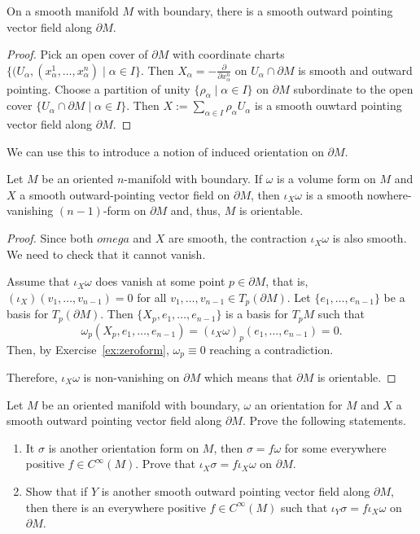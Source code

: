 \begin{proposition}
  On a smooth manifold $M$ with boundary, there is a smooth outward pointing vector field along $\partial M$.  
\end{proposition}
\begin{proof}
  Pick an open cover of $\partial M$ with coordinate charts $\{(U_\alpha, (x^1_\alpha,\ldots,x^n_\alpha) \mid \alpha\in I\}$. Then $X_\alpha = -\frac{\partial}{\partial x^n_\alpha}$ on $U_\alpha\cap \partial M$ is smooth and outward pointing.
  Choose a partition of unity $\{\rho_\alpha \mid \alpha\in I\}$ on $\partial M$ subordinate to the open cover $\{U_\alpha\cap \partial M \mid \alpha\in I\}$.
  Then $X:= \sum_{\alpha\in I}\rho_\alpha U_\alpha$ is a smooth ouwtard pointing vector field along $\partial M$.
\end{proof}

We can use this to introduce a notion of induced orientation on $\partial M$.

\begin{proposition}
  Let $M$ be an oriented $n$-manifold with boundary.
  If $\omega$ is a volume form on $M$ and $X$ a smooth outward-pointing vector field on $\partial M$, then $\iota_X\omega$ is a smooth nowhere-vanishing $(n-1)$-form on $\partial M$ and, thus, $M$ is orientable.
\end{proposition}
\begin{proof}
  Since both $omega$ and $X$ are smooth, the contraction $\iota_X\omega$ is also smooth.
  We need to check that it cannot vanish.

  Assume that $\iota_X\omega$ does vanish at some point $p\in\partial M$, that is, $(\iota_X)(v_1, \ldots, v_{n-1}) = 0$ for all $v_1, \ldots, v_{n-1}\in T_p(\partial M)$.
  Let $\{e_1,\ldots,e_{n-1}\}$ be a basis for $T_p(\partial M)$.
  Then $\{X_p,e_1,\ldots,e_{n-1}\}$ is a basis for $T_p M$ such that
  \begin{equation}
    \omega_p(X_p, e_1, \ldots, e_{n-1}) = (\iota_X\omega)_p(e_1, \ldots, e_{n-1}) = 0.
  \end{equation}
  Then, by Exercise~\ref{ex:zeroform}, $\omega_p\equiv0$ reaching a contradiction.
  
  Therefore, $\iota_X\omega$ is non-vanishing on $\partial M$ which means that $\partial M$ is orientable.
\end{proof}

\begin{exercise}
  Let $M$ be an oriented manifold with boundary, $\omega$ an orientation for $M$ and $X$ a smooth outward pointing vector field along $\partial M$.
  Prove the following statements.
  \begin{enumerate}
    \item It $\sigma$ is another orientation form on $M$, then $\sigma = f\omega$ for some everywhere positive $f\in C^\infty(M)$. Prove that  $\iota_X\sigma = f\iota_X \omega$ on $\partial M$.
    \item Show that if $Y$ is another smooth outward pointing vector field along $\partial M$, then there is an everywhere positive $f\in C^\infty(M)$ such that $\iota_Y\sigma = f \iota_X \omega$ on $\partial M$.
  \end{enumerate}
\end{exercise}

